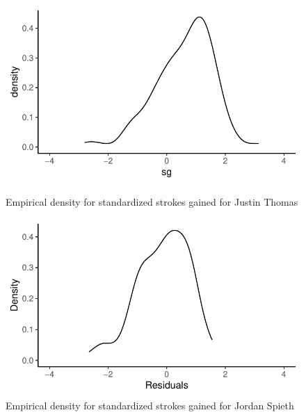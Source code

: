 \documentclass{article}\usepackage[]{graphicx}\usepackage[]{color}
\begin{document}
\begin{figure}[h]
\begin{minipage}{0.475\textwidth}
    \centering
    \includegraphics[width=1\textwidth]{Figures/empirical_density_thomas.pdf}
    \caption{Empirical density for standardized strokes gained for Justin Thomas}
    \label{fig:thomas_empirical_density}
\end{minipage}
\hspace{0.05\textwidth}
\begin{minipage}{0.475\textwidth}
    \centering
    \includegraphics[width=1\textwidth]{Figures/empirical_density_spieth.pdf}
    \caption{Empirical density for standardized strokes gained for Jordan Spieth}
    \label{fig:spieth_empirical_density}
\end{minipage}
\end{figure}
%
\end{document}
